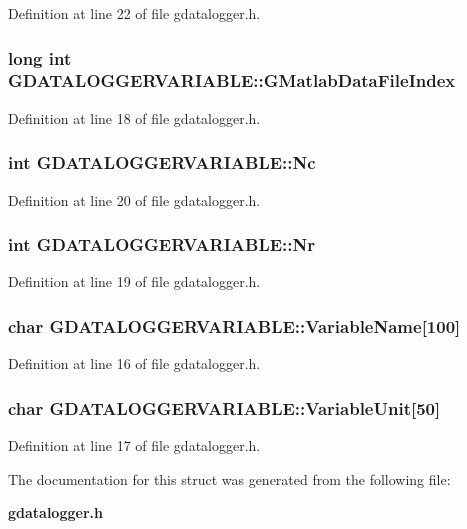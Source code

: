 Definition at line 22 of file gdatalogger.h.
\subsubsection[{GMatlabDataFileIndex}]{\setlength{\rightskip}{0pt plus 5cm}long int {\bf GDATALOGGERVARIABLE::GMatlabDataFileIndex}}\label{structGDATALOGGERVARIABLE_aa1cd5b838d8655734e7d4499b25bf22a}


Definition at line 18 of file gdatalogger.h.
\subsubsection[{Nc}]{\setlength{\rightskip}{0pt plus 5cm}int {\bf GDATALOGGERVARIABLE::Nc}}\label{structGDATALOGGERVARIABLE_abd1db7599f09e121cd125e665cb9c460}


Definition at line 20 of file gdatalogger.h.
\subsubsection[{Nr}]{\setlength{\rightskip}{0pt plus 5cm}int {\bf GDATALOGGERVARIABLE::Nr}}\label{structGDATALOGGERVARIABLE_a68c3eb0f57a786afe9a2658fc42b61d6}


Definition at line 19 of file gdatalogger.h.
\subsubsection[{VariableName}]{\setlength{\rightskip}{0pt plus 5cm}char {\bf GDATALOGGERVARIABLE::VariableName}[100]}\label{structGDATALOGGERVARIABLE_a336b7b6cbfc9cdebc7e1ade3de17ac3f}


Definition at line 16 of file gdatalogger.h.
\subsubsection[{VariableUnit}]{\setlength{\rightskip}{0pt plus 5cm}char {\bf GDATALOGGERVARIABLE::VariableUnit}[50]}\label{structGDATALOGGERVARIABLE_a0d42da63f3f904774cbf2ee8d92ee135}


Definition at line 17 of file gdatalogger.h.

The documentation for this struct was generated from the following file:\begin{DoxyCompactItemize}
\item 
{\bf gdatalogger.h}\end{DoxyCompactItemize}
